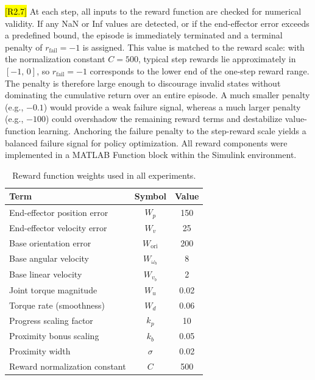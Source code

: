 \documentclass{ieeeaccess}
\newcommand{\hltwo}[1]{{\sethlcolor{rtwo}\hl{#1}}}
\newenvironment{rtwohl}
  {\def\FrameCommand{\colorbox{rtwo}}\MakeFramed{\advance\hsize-\width\FrameRestore}}
  {\endMakeFramed}
\begin{document}
\begin{rtwohl}
\hltwo{[R2.7]} At each step, all inputs to the reward function are checked for numerical validity. If any NaN or Inf values are detected, or if the end-effector error exceeds a predefined bound, the episode is immediately terminated and a terminal penalty of $r_{\text{fail}} = -1$ is assigned. This value is matched to the reward scale: with the normalization constant $C = 500$, typical step rewards lie approximately in $[-1,\,0]$, so $r_{\text{fail}} = -1$ corresponds to the lower end of the one-step reward range. The penalty is therefore large enough to discourage invalid states without dominating the cumulative return over an entire episode. A much smaller penalty (e.g., $-0.1$) would provide a weak failure signal, whereas a much larger penalty (e.g., $-100$) could overshadow the remaining reward terms and destabilize value-function learning. Anchoring the failure penalty to the step-reward scale yields a balanced failure signal for policy optimization.
\end{rtwohl}
All reward components were implemented in a MATLAB Function block within the Simulink environment.

\begin{table}[!b]
\centering
\caption{Reward function weights used in all experiments.}
\label{tab:reward_weights}
\begin{tabular}{lcc}
\toprule
\textbf{Term} & \textbf{Symbol} & \textbf{Value} \\
\midrule
End-effector position error      & $W_p$              & 150   \\
End-effector velocity error      & $W_v$              & 25    \\
Base orientation error           & $W_{\text{ori}}$   & 200   \\
Base angular velocity            & $W_{\omega_b}$     & 8     \\
Base linear velocity             & $W_{v_b}$          & 2     \\
Joint torque magnitude           & $W_u$              & 0.02  \\
Torque rate (smoothness)         & $W_d$              & 0.06  \\
Progress scaling factor          & $k_p$              & 10    \\
Proximity bonus scaling          & $k_b$              & 0.05  \\
Proximity width                  & $\sigma$           & 0.02  \\
Reward normalization constant    & $C$                & 500   \\
\bottomrule
\end{tabular}
\end{table}
\end{document}
